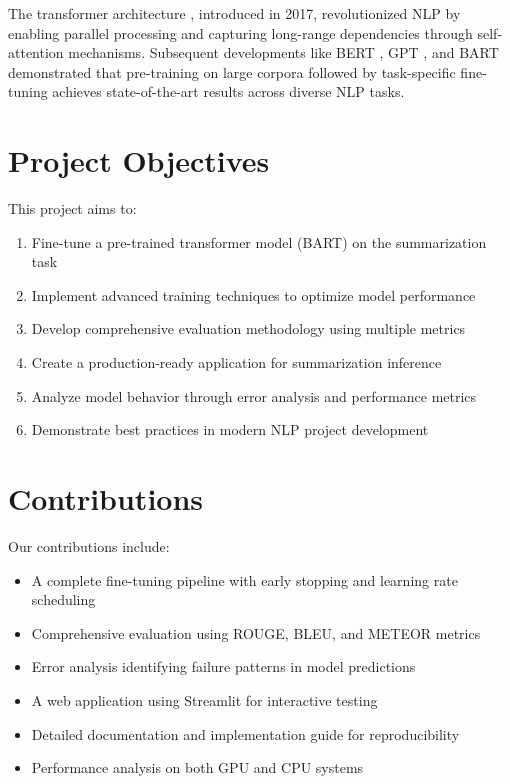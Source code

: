 \documentclass[12pt,a4paper,oneside]{report}
\begin{document}
The transformer architecture \cite{vaswani2017attention}, introduced in 2017, revolutionized NLP by enabling parallel processing and capturing long-range dependencies through self-attention mechanisms. Subsequent developments like BERT \cite{devlin2019bert}, GPT \cite{radford2018language}, and BART \cite{lewis2019bart} demonstrated that pre-training on large corpora followed by task-specific fine-tuning achieves state-of-the-art results across diverse NLP tasks.

\section{Project Objectives}
This project aims to:
\begin{enumerate}
    \item Fine-tune a pre-trained transformer model (BART) on the summarization task
    \item Implement advanced training techniques to optimize model performance
    \item Develop comprehensive evaluation methodology using multiple metrics
    \item Create a production-ready application for summarization inference
    \item Analyze model behavior through error analysis and performance metrics
    \item Demonstrate best practices in modern NLP project development
\end{enumerate}

\section{Contributions}
Our contributions include:
\begin{itemize}
    \item A complete fine-tuning pipeline with early stopping and learning rate scheduling
    \item Comprehensive evaluation using ROUGE, BLEU, and METEOR metrics
    \item Error analysis identifying failure patterns in model predictions
    \item A web application using Streamlit for interactive testing
    \item Detailed documentation and implementation guide for reproducibility
    \item Performance analysis on both GPU and CPU systems
\end{itemize}
\end{document}
